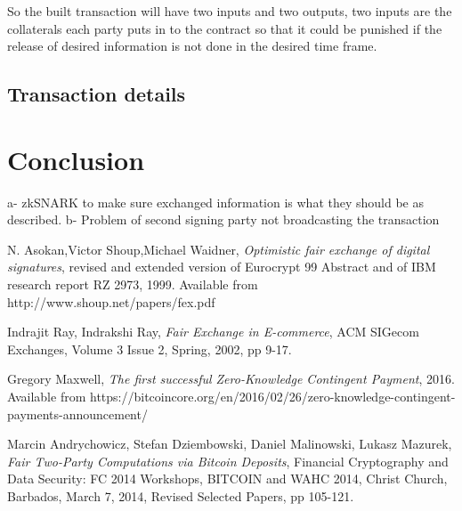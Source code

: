\documentclass[]{article}
\begin{document}
So the built transaction will have two inputs and two outputs, two inputs are the collaterals each party puts in to the contract so that it could be punished if the release of desired information is not done in the desired time frame.

\subsection{Transaction details}

\section{Conclusion}
a- zkSNARK to make sure exchanged information is what they should be as described.
b- Problem of second signing party not broadcasting the transaction

\begin{thebibliography}{9}
	    N. Asokan,Victor Shoup,Michael Waidner,
	    \textit{Optimistic fair exchange of digital signatures},
	    revised and extended version of Eurocrypt 99 Abstract and of IBM research report RZ 2973, 1999. Available from http://www.shoup.net/papers/fex.pdf
		
	Indrajit Ray, Indrakshi Ray, 
	\textit{Fair Exchange in E-commerce},
	ACM SIGecom Exchanges, Volume 3 Issue 2, Spring, 2002,
	pp 9-17. 
	
	Gregory Maxwell,
	\textit{The first successful Zero-Knowledge Contingent Payment}, 2016.
	Available from https://bitcoincore.org/en/2016/02/26/zero-knowledge-contingent-payments-announcement/
	
	Marcin Andrychowicz, Stefan Dziembowski, Daniel Malinowski, Lukasz Mazurek,
	\textit{Fair Two-Party Computations via Bitcoin Deposits}, Financial Cryptography and Data Security: FC 2014 Workshops, BITCOIN and WAHC 2014, Christ Church, Barbados, March 7, 2014, Revised Selected Papers, pp 105-121.
	    
\end{thebibliography}
\end{document}
